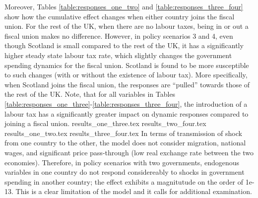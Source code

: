 Moreover, Tables \ref{table:responses_one_two} and \ref{table:responses_three_four} show how the cumulative effect changes when either country joins the fiscal union. For the rest of the UK, when there are no labour taxes, being in or out a fiscal union makes no difference. However, in policy scenarios 3 and 4, even though Scotland is small compared to the rest of the UK, it has a significantly higher steady state labour tax rate, which slightly changes the government spending dynamics for the fiscal union. Scotland is found to be more susceptible to such changes (with or without the existence of labour tax). More specifically, when Scotland joins the fiscal union, the responses are ``pulled'' towards those of the rest of the UK. Note, that for all variables in Tables \ref{table:responses_one_three}-\ref{table:responses_three_four}, the introduction of a labour tax has a significantly greater impact on dynamic responses compared to joining a fiscal union.
{results_one_three.tex}
{results_two_four.tex}
\newpage
{results_one_two.tex}
{results_three_four.tex}
In terms of transmission of shock from one country to the other, the model does not consider migration, national wages, and significant price pass-through (low real exchange rate between the two economies). Therefore, in policy scenarios with two governments, endogenous variables in one country do not respond considereably to shocks in government spending in another country; the effect exhibits a magnitutude on the order of 1e-13. This is a clear limitation of the model and it calls for additional examination.

